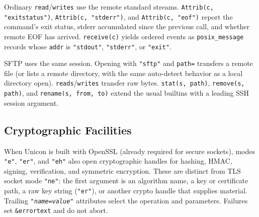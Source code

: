 
Ordinary \texttt{read}/\texttt{writes} use the remote standard streams.
\texttt{Attrib(c, "exitstatus")}, \texttt{Attrib(c, "stderr")}, and
\texttt{Attrib(c, "eof")} report the command's exit status, stderr
accumulated since the previous call, and whether remote EOF has arrived.
\texttt{receive(c)} yields ordered events as
\texttt{posix\_message} records whose \texttt{addr} is
\texttt{"stdout"}, \texttt{"stderr"}, or \texttt{"exit"}.

SFTP uses the same session. Opening with \texttt{"sftp"} and
\texttt{path=} transfers a remote file (or lists a remote directory,
with the same auto-detect behavior as a local directory open).
\texttt{reads}/\texttt{writes} transfer raw bytes.
\texttt{stat(s, path)}, \texttt{remove(s, path)}, and
\texttt{rename(s, from, to)} extend the usual builtins with a leading
SSH session argument.


\subsection*{Cryptographic Facilities}

When Unicon is built with OpenSSL (already required for secure sockets),
modes \texttt{"e"}, \texttt{"er"}, and \texttt{"eh"} also open
cryptographic handles for hashing, HMAC, signing,
verification, and symmetric encryption. These are distinct from TLS
socket mode \texttt{"ne"}: the first argument is an algorithm name, a
key or certificate path, a raw key string (\texttt{"er"}), or another
crypto handle that supplies material. Trailing
\texttt{"\textit{name}=\textit{value}"} attributes select the operation
and parameters. Failures set \texttt{\&errortext} and do not abort.

